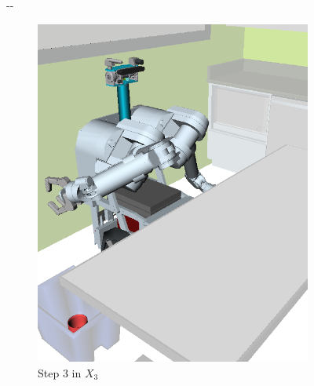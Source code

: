 \documentclass{report}
\newlength{\offsetpage}
\newenvironment{widepage}
   {\begin{adjustwidth}{-\offsetpage}{-\offsetpage}%
    \addtolength{\textwidth}{2\offsetpage}}%
{\end{adjustwidth}}
\begin{document}
{\begin{figure}
\begin{widepage}
\begin{center}
\begin{subfigure}[t]{0.19\linewidth}
\includegraphics[width=\columnwidth]{figs/testherb-d.png}
\caption{Step 3 in $X_3$}
\end{subfigure}
\begin{subfigure}[t]{0.19\linewidth}
\centering

\end{subfigure}
\end{center}
\end{widepage}
\end{figure}}
\end{document}
